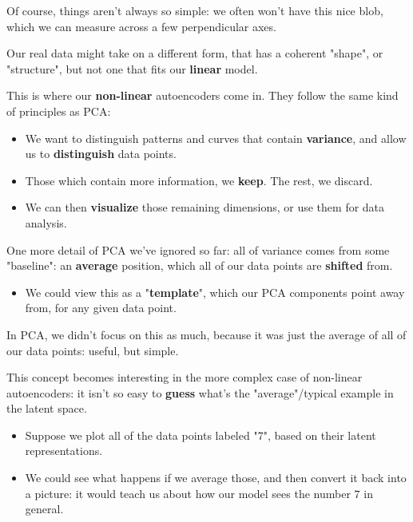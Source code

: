         Of course, things aren't always so simple: we often won't have this nice blob, which we can measure across a few perpendicular axes.

        Our real data might take on a different form, that has a coherent "shape", or "structure", but not one that fits our \textbf{linear} model.

        This is where our \textbf{non-linear} autoencoders come in. They follow the same kind of principles as PCA: 
        
        \begin{itemize}
            \item We want to distinguish patterns and curves that contain \textbf{variance}, and allow us to \textbf{distinguish} data points.
            \item Those which contain more information, we \textbf{keep}. The rest, we discard.
            \item We can then \textbf{visualize} those remaining dimensions, or use them for data analysis.
        \end{itemize}

        \subsecdiv

        One more detail of PCA we've ignored so far: all of variance comes from some "baseline": an \textbf{average} position, which all of our data points are \textbf{shifted} from.

        \begin{itemize}
            \item We could view this as a "\textbf{template}", which our PCA components point away from, for any given data point.
        \end{itemize}

        In PCA, we didn't focus on this as much, because it was just the average of all of our data points: useful, but simple.

        This concept becomes interesting in the more complex case of non-linear autoencoders: it isn't so easy to \textbf{guess} what's the "average"/typical example in the latent space.
        
        \begin{itemize}
            \item \miniex Suppose we plot all of the data points labeled "7", based on their latent representations.
            \item We could see what happens if we average those, and then convert it back into a picture: it would teach us about how our model sees the number $7$ in general.
            
        \end{itemize}

